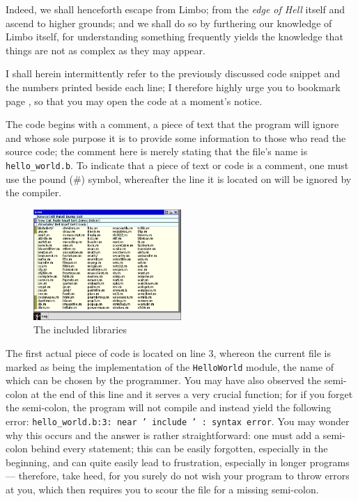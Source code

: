 \documentclass[a5paper,twoside,12pt]{report}
\begin{document}
Indeed, we shall henceforth escape from Limbo; from the \textit{edge of Hell} itself and ascend to higher grounds; and we shall do so by furthering our knowledge of Limbo itself, for understanding something frequently yields the knowledge that things are not as complex as they may appear.

I shall herein intermittently refer to the previously discussed code snippet and the numbers printed beside each line; I therefore highly urge you to bookmark page \pageref{hello-world}, so that you may open the code at a moment's notice.

The code begins with a comment, a piece of text that the program will ignore and whose sole purpose it is to provide some information to those who read the source code; the comment here is merely stating that the file's name is \texttt{hello\_world.b}. To indicate that a piece of text or code is a comment, one must use the pound (\#) symbol, whereafter the line it is located on will be ignored by the compiler.

\begin{figure}
  \centering
  \includegraphics[width=0.5\textwidth]{imgs/modules.png}
  \caption{The included libraries}
\end{figure}

The first actual piece of code is located on line 3, whereon the current file is marked as being the implementation of the \texttt{HelloWorld} module, the name of which can be chosen by the programmer. You may have also observed the semi-colon at the end of this line and it serves a very crucial function; for if you forget the semi-colon, the program will not compile and instead yield the following error: \texttt{hello\_world.b:3: near ' include ' : syntax error}. You may wonder why this occurs and the answer is rather straightforward: one must add a semi-colon behind every statement; this can be easily forgotten, especially in the beginning, and can quite easily lead to frustration, especially in longer programs — therefore, take heed, for you surely do not wish your program to throw errors at you, which then requires you to scour the file for a missing semi-colon.
\end{document}
